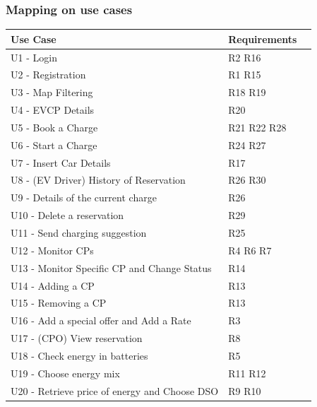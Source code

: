 \subsubsection{Mapping on use cases}
\begin{table}[H]
    \begin{tabularx}{\textwidth}{XXX}
        \toprule
        \textbf{Use Case}                             & \textbf{Requirements} \\ \midrule
        U1 - Login                                    & R2 R16                \\
        U2 - Registration                             & R1 R15                \\
        U3 - Map Filtering                            & R18 R19               \\
        U4 - EVCP Details                             & R20                   \\
        U5 - Book a Charge                            & R21 R22 R28           \\
        U6 - Start a Charge                           & R24 R27               \\
        U7 - Insert Car Details                       & R17                   \\
        U8 - (EV Driver) History of Reservation       & R26 R30               \\
        U9 - Details of the current charge            & R26                   \\
        U10 - Delete a reservation                    & R29                   \\
        U11 - Send charging suggestion                & R25                   \\
        U12 - Monitor CPs                             & R4 R6 R7              \\
        U13 - Monitor Specific CP and Change Status   & R14                   \\
        U14 - Adding a CP                             & R13                   \\
        U15 - Removing a CP                           & R13                   \\
        U16 - Add a special offer and Add a Rate      & R3                    \\
        U17 - (CPO) View reservation                  & R8                    \\
        U18 - Check energy in batteries               & R5                    \\
        U19 - Choose energy mix                       & R11 R12               \\
        U20 - Retrieve price of energy and Choose DSO & R9 R10                \\
        \bottomrule
    \end{tabularx}
\end{table}

